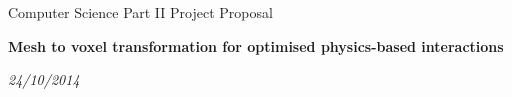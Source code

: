 \documentclass[a4 paper,twoside,12pt]{article}
\begin{document}

\begin{titlepage}

\medskip
{}
\medskip
{}

\vfil
\centerline{\large Computer Science Part II Project Proposal}
\vspace{0.4in}
\begin{center}
\Large\bf Mesh to voxel transformation for optimised physics-based interactions
\end{center}
\vspace{0.3in}
\centerline{\large \emph{24/10/2014}}

\vfil

\eject

\end{titlepage}

\cleardoublepage















\end{document}
